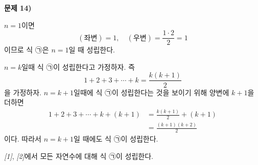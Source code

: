 \documentclass{oblivoir}
\newcounter{num}
\newcommand\an[1]{\par\bigskip\noindent\textbf{문제 #1)}\\}
\begin{document}
%
\an{14}
\begin{enumerate}[label=\emph{[\arabic*]}]
\item
\(n=1\)이면
\[(좌변)=1,\quad (우변)=\frac{1\cdot2}2=1\]
이므로 식 ㉠은 \(n=1\)일 때 성립한다.
\item
\(n=k\)일때 식 ㉠이 성립한다고 가정하자.
즉
\[
1+2+3+\cdots+k=\frac{k(k+1)}2
\]
을 가정하자.
\(n=k+1\)일때에 식 ㉠이 성립한다는 것을 보이기 위해 양변에 \(k+1\)을 더하면
\begin{align*}
1+2+3+\cdots+k+(k+1)
&=\frac{k(k+1)}2+(k+1)\\
&=\frac{(k+1)(k+2)}2
\end{align*}
이다.
따라서 \(n=k+1\)일 때에도 식 ㉠이 성립한다.
\end{enumerate}
\emph{[1]}, \emph{[2]}에서 모든 자연수에 대해 식 ㉠이 성립한다.
\end{document}
